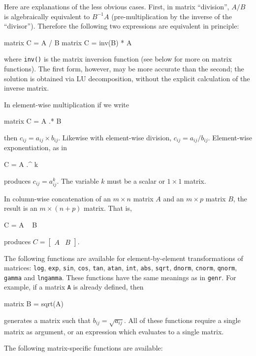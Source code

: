 Here are explanations of the less obvious cases.  First, in matrix
``division'', $A/B$ is algebraically equivalent to $B^{-1}A$
(pre-multiplication by the inverse of the ``divisor'').  Therefore the
following two expressions are equivalent in principle:
%
\begin{code}
matrix C = A / B
matrix C = inv(B) * A
\end{code}
%
where \texttt{inv()} is the matrix inversion function (see below for
more on matrix functions).  The first form, however, may be more
accurate than the second; the solution is obtained via LU
decomposition, without the explicit calculation of the inverse matrix.

In element-wise multiplication if we write
%
\begin{code}
matrix C = A .* B
\end{code}
% 
then $c_{ij} = a_{ij} \times b_{ij}$.  Likewise with element-wise
division, $c_{ij} = a_{ij}/b_{ij}$. Element-wise exponentiation, as in
%
\begin{code}
C = A .^ k
\end{code}
% 
produces $c_{ij} = a_{ij}^k$.  The variable $k$ must be a scalar or
$1\times 1$ matrix.

In column-wise concatenation of an $m\times n$ matrix $A$ and
an $m\times p$ matrix $B$, the result is an $m\times (n+p)$ matrix.
That is,
%
\begin{code}
C = A ~ B
\end{code}
% 
produces $C = \left[ \begin{array}{cc} A & B \end{array} \right]$.

The following functions are available for element-by-element
transformations of matrices: \texttt{log}, \texttt{exp}, \texttt{sin},
\texttt{cos}, \texttt{tan}, \texttt{atan}, \texttt{int}, \texttt{abs},
\texttt{sqrt}, \texttt{dnorm}, \texttt{cnorm}, \texttt{qnorm},
\texttt{gamma} and \texttt{lngamma}.  These functions have the same
meanings as in \texttt{genr}.  For example, if a matrix \texttt{A} is
already defined, then
%
\begin{code}
matrix B = sqrt(A)
\end{code}
%
generates a matrix such that $b_{ij} = \sqrt{a_{ij}}$.  All of these
functions require a single matrix as argument, or an expression which
evaluates to a single matrix.

The following matrix-specific functions are available:

